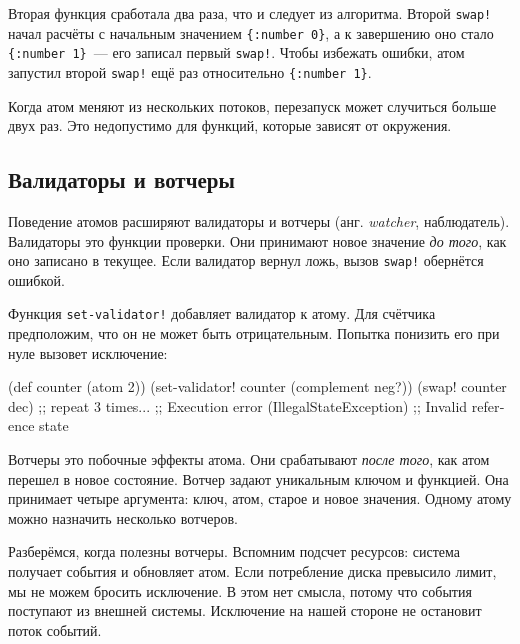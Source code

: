 Вторая функция сработала два раза, что и следует из алгоритма. Второй
\verb|swap!| начал расчёты с начальным значением \verb|{:number 0}|, а к
завершению оно стало \verb|{:number 1}|~--- его записал первый
\verb|swap!|. Чтобы избежать ошибки, атом запустил второй \verb|swap!|
ещё раз относительно \verb|{:number 1}|.

Когда атом меняют из нескольких потоков, перезапуск может случиться больше двух
раз. Это недопустимо для функций, которые зависят от окружения.

\subsection{Валидаторы и вотчеры}


Поведение атомов расширяют валидаторы и вотчеры (анг. \emph{watcher},
наблюдатель). Валидаторы это функции проверки. Они принимают новое значение
\emph{до того}, как оно записано в текущее. Если валидатор вернул ложь, вызов
\verb|swap!| обернётся ошибкой.


Функция \verb|set-validator!| добавляет валидатор к атому. Для счётчика
предположим, что он не может быть отрицательным. Попытка понизить его при нуле
вызовет исключение:

\begin{english}
  \begin{clojure}
(def counter (atom 2))
(set-validator! counter (complement neg?))
(swap! counter dec) ;; repeat 3 times...
;; Execution error (IllegalStateException)
;; Invalid reference state
  \end{clojure}
\end{english}

Вотчеры это побочные эффекты атома. Они срабатывают \emph{после того}, как атом
перешел в новое состояние. Вотчер задают уникальным ключом и функцией. Она
принимает четыре аргумента: ключ, атом, старое и новое значения. Одному атому
можно назначить несколько вотчеров.

Разберёмся, когда полезны вотчеры. Вспомним подсчет ресурсов: система получает
события и обновляет атом. Если потребление диска превысило лимит, мы не можем
бросить исключение. В этом нет смысла, потому что события поступают из внешней
системы. Исключение на нашей стороне не остановит поток событий.



